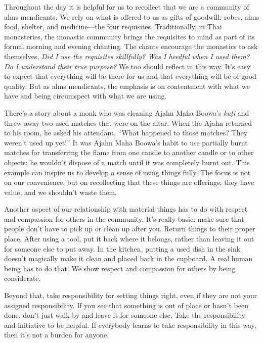 
Throughout the day it is helpful for us to recollect that we are a 
community of alms mendicants. We rely on what is offered to us as gifts 
of goodwill: robes, alms food, shelter, and medicine---the four 
requisites. Traditionally, in Thai monasteries, the monastic community 
brings the requisites to mind as part of its formal morning and evening 
chanting. The chants encourage the monastics to ask themselves, 
\emph{Did I use the requisites skillfully? Was I heedful when I used 
them? Do I understand their true purpose?} We too should reflect in 
this way. It's easy to expect that everything will be there for us and 
that everything will be of good quality. But as alms mendicants, the 
emphasis is on contentment with what we have and being circumspect with 
what we are using.

There's a story about a monk who was cleaning Ajahn Maha Boowa's 
\emph{kuṭi} and threw away two used matches that were on the altar. 
When the Ajahn returned to his room, he asked his attendant, ``What 
happened to those matches? They weren't used up yet!'' It was Ajahn 
Maha Boowa's habit to use partially burnt matches for transferring the 
flame from one candle to another candle or to other objects; he 
wouldn't dispose of a match until it was completely burnt out. This 
example can inspire us to develop a sense of using things fully. The 
focus is not on our convenience, but on recollecting that these things 
are offerings; they have value, and we shouldn't waste them.

Another aspect of our relationship with material things has to do with 
respect and compassion for others in the community. It's really basic: 
make sure that people don't have to pick up or clean up after you. 
Return things to their proper place. After using a tool, put it back 
where it belongs, rather than leaving it out for someone else to put 
away. In the kitchen, putting a used dish in the sink doesn't magically 
make it clean and placed back in the cupboard. A real human being has 
to do that. We show respect and compassion for others by being 
considerate.

Beyond that, take responsibility for setting things right, even if they 
are not your assigned responsibility. If you see that something is out 
of place or hasn't been done, don't just walk by and leave it for 
someone else. Take the responsibility and initiative to be helpful. If 
everybody learns to take responsibility in this way, then it's not a 
burden for anyone.


